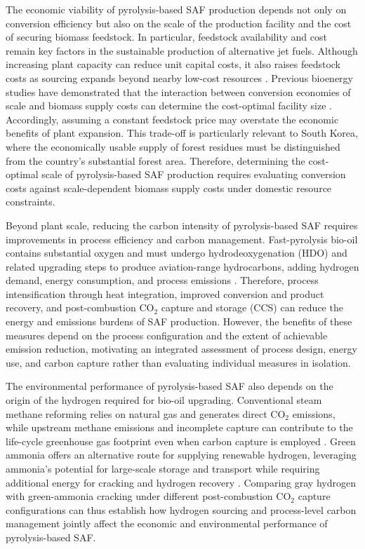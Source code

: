 The economic viability of pyrolysis-based SAF production depends not only on conversion efficiency but also on the scale of the production facility and the cost of securing biomass feedstock. In particular, feedstock availability and cost remain key factors in the sustainable production of alternative jet fuels. Although increasing plant capacity can reduce unit capital costs, it also raises feedstock costs as sourcing expands beyond nearby low-cost resources \citep{chireshe2025cost}. Previous bioenergy studies have demonstrated that the interaction between conversion economies of scale and biomass supply costs can determine the cost-optimal facility size \citep{de2017cost}. Accordingly, assuming a constant feedstock price may overstate the economic benefits of plant expansion. This trade-off is particularly relevant to South Korea, where the economically usable supply of forest residues must be distinguished from the country's substantial forest area. Therefore, determining the cost-optimal scale of pyrolysis-based SAF production requires evaluating conversion costs against scale-dependent biomass supply costs under domestic resource constraints. 

Beyond plant scale, reducing the carbon intensity of pyrolysis-based SAF requires improvements in process efficiency and carbon management. Fast-pyrolysis bio-oil contains substantial oxygen and must undergo hydrodeoxygenation (HDO) and related upgrading steps to produce aviation-range hydrocarbons, adding hydrogen demand, energy consumption, and process emissions \citep{sorunmu2020review}. Therefore, process intensification through heat integration, improved conversion and product recovery, and post-combustion CO$_2$ capture and storage (CCS) can reduce the energy and emissions burdens of SAF production. However, the benefits of these measures depend on the process configuration and the extent of achievable emission reduction, motivating an integrated assessment of process design, energy use, and carbon capture rather than evaluating individual measures in isolation. 

The environmental performance of pyrolysis-based SAF also depends on the origin of the hydrogen required for bio-oil upgrading. Conventional steam methane reforming relies on natural gas and generates direct CO$_2$ emissions, while upstream methane emissions and incomplete capture can contribute to the life-cycle greenhouse gas footprint even when carbon capture is employed \citep{howarth2021green}. Green ammonia offers an alternative route for supplying renewable hydrogen, leveraging ammonia's potential for large-scale storage and transport while requiring additional energy for cracking and hydrogen recovery \citep{salmon2021green}. Comparing gray hydrogen with green-ammonia cracking under different post-combustion CO$_2$ capture configurations can thus establish how hydrogen sourcing and process-level carbon management jointly affect the economic and environmental performance of pyrolysis-based SAF. 

